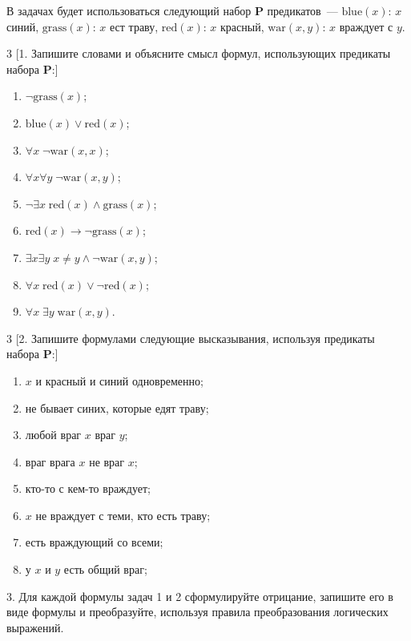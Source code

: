 \documentclass[a4paper,10pt]{article}
\begin{document}
В задачах будет использоваться следующий набор \textbf P предикатов~---
$\mathrm{blue}(x)$: $x$ синий,
$\mathrm{grass}(x)$: $x$ ест траву,
$\mathrm{red}(x)$: $x$ красный,
$\mathrm{war}(x, y)$: $x$ враждует с $y$.

		\begin{multicols}{3}
			[1. Запишите словами и объясните смысл формул, использующих  предикаты набора \textbf P:]
			\begin{enumerate}[label=(\arabic*)\,]
				\item $\lnot\mathrm{grass}(x)$;
				\item $\mathrm{blue}(x)\lor\mathrm{red}(x)$;
				\item $\forall x\;\lnot\mathrm{war}(x,x)$;
				\item $\forall x\forall y\;\lnot\mathrm{war}(x,y)$;
				\item $\lnot\exists x\; \mathrm{red}(x)\land\mathrm{grass}(x)$;
				\item $\mathrm{red}(x)\to\lnot\mathrm{grass}(x)$;
				\item $\exists x\exists y\; x\ne y\land\lnot\mathrm{war}(x,y)$;
				\item $\forall x\;\mathrm{red}(x)\lor\lnot\mathrm{red}(x)$;
				\item $\forall x\;\exists y\;\mathrm{war}(x,y)$.
			\end{enumerate}
		\end{multicols}

		\begin{multicols}{3}
			[2. Запишите формулами следующие высказывания, используя предикаты набора \textbf P:]
			\begin{enumerate}[label=(\arabic*)\,]
				\item $x$ и красный и синий одновременно;
				\item не бывает синих, которые едят траву;
				\item любой враг $x$ враг $y$;
				\item враг врага $x$ не враг $x$;
				\item кто-то с кем-то враждует;
				\item $x$ не враждует с теми, кто есть траву;
				\item есть враждующий со всеми;
				\item у $x$ и $y$ есть общий враг;
			\end{enumerate}
		\end{multicols}

		3. Для каждой формулы задач 1 и 2 сформулируйте отрицание, запишите его в виде формулы и преобразуйте, используя правила преобразования логических выражений.
\end{document}
